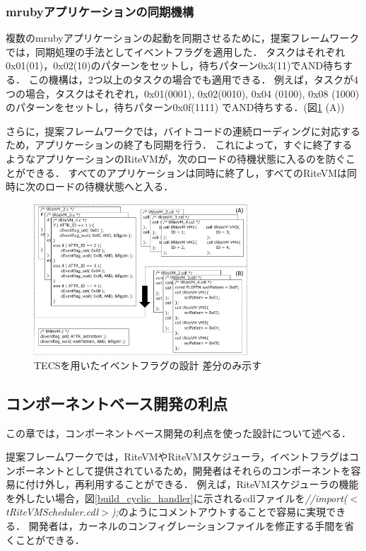 \documentclass[submit,techrep]{ipsj}
\begin{document}
\subsubsection{mrubyアプリケーションの同期機構}
複数のmrubyアプリケーションの起動を同期させるために，提案フレームワークでは，同期処理の手法としてイベントフラグを適用した．
タスクはそれぞれ0x01(01)，0x02(10)のパターンをセットし，待ちパターン0x3(11)でAND待ちする．
この機構は，2つ以上のタスクの場合でも適用できる．
例えば，タスクが4つの場合，タスクはそれぞれ，0x01(0001), 0x02(0010), 0x04 (0100), 0x08 (1000)のパターンをセットし，待ちパターン0x0f(1111) でAND待ちする．(図\ref{fig:Eventflag} (A))

さらに，提案フレームワークでは，バイトコードの連続ローディングに対応するため，アプリケーションの終了も同期を行う．
これによって，すぐに終了するようなアプリケーションのRiteVMが，次のロードの待機状態に入るのを防ぐことができる．
すべてのアプリケーションは同時に終了し，すべてのRiteVMは同時に次のロードの待機状態へと入る．

\begin{figure}[t]
    \centering
    \includegraphics[width=8cm,clip]{../EMSOFT2016/figure/Eventflag.pdf}
    \caption{TECSを用いたイベントフラグの設計 {\scriptsize *差分のみ示す}}
    \label{fig:Eventflag}
\end{figure}
 
\subsection{コンポーネントベース開発の利点}
この章では，コンポーネントベース開発の利点を使った設計について述べる．

提案フレームワークでは，RiteVMやRiteVMスケジューラ，イベントフラグはコンポーネントとして提供されているため，開発者はそれらのコンポーネントを容易に付け外し，再利用することができる．
例えば，RiteVMスケジューラの機能を外したい場合，図\ref{build_cyclic_handler}に示されるcdlファイルを{\it //import($<$tRiteVMScheduler.cdl$>$);}のようにコメントアウトすることで容易に実現できる．
開発者は，カーネルのコンフィグレーションファイルを修正する手間を省くことができる．
\end{document}
